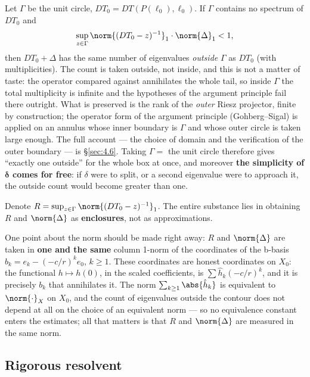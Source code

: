 Let $\Gamma$ be the unit circle, $DT_{0} = DT(P(\ell_{0}), \ell_{0})$. If $\Gamma$ contains no
spectrum of $DT_{0}$ and
\[
\sup_{z \in \Gamma} \norm{(DT_{0} - z)^{-1}}_{1} \cdot \norm{\Delta}_{1} < 1,
\]
then $DT_{0} + \Delta$ has the same number of eigenvalues \emph{outside} $\Gamma$ as
$DT_{0}$ (with multiplicities). The count is taken outside, not inside, and this is
not a matter of taste: the operator compared against annihilates the whole tail, so
inside $\Gamma$ the total multiplicity is infinite and the hypotheses of the argument
principle fail there outright. What is preserved is the rank of the \emph{outer}
Riesz projector, finite by construction; the operator form of the argument principle
(Gohberg--Sigal) is applied on an annulus whose inner boundary is $\Gamma$ and whose
outer circle is taken large enough. The full account --- the choice of domain and the
verification of the outer boundary --- is \S\ref{sec:4.6}. Taking $\Gamma =$ the unit circle therefore gives ``exactly one outside''
for the whole box at once, and moreover \textbf{the simplicity of $\boldsymbol{\delta}$ comes for
free}: if $\delta$ were to split, or a second eigenvalue were to approach it, the
outside count would become greater than one.

Denote $R = \sup_{z\in\Gamma} \norm{(DT_{0} - z)^{-1}}_{1}$. The entire substance lies in
obtaining $R$ and $\norm{\Delta}$ as \textbf{enclosures}, not as approximations.

One point about the norm should be made right away: $R$ and $\norm{\Delta}$ are
taken in \textbf{one and the same} column 1-norm of the coordinates of the
b-basis $b_k = e_k - (-c/r)^k e_{0}$, $k \ge 1$. These coordinates are honest
coordinates on $X_{0}$: the functional $h \mapsto h(0)$, in the scaled coefficients,
is $\sum \hat{h}_k (-c/r)^k$, and it is precisely $b_k$ that annihilates it. The
norm $\sum_{k\ge 1}\abs{\hat{h}_k}$ is equivalent to $\norm{\cdot}_X$ on $X_{0}$, and the count of
eigenvalues outside the contour does not depend at all on the choice of an
equivalent norm --- so no equivalence constant enters the estimates; all
that matters is that $R$ and $\norm{\Delta}$ are measured in the same norm.


\subsection{Rigorous resolvent}\label{sec:4.4}

